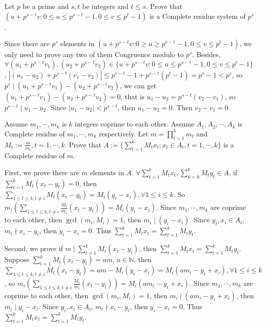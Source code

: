 \documentclass{ctexart}
\begin{document}
\begin{problem}\label{pro:p40.1}
  Let \(p\) be a prime and \(s,t\) be integers and \(t \leq s\).
  Prove that \((u+p^{s-t}v:0 \leq u \leq p^{s-t}-1,0 \leq v \leq p^t-1)\) is a Complete residue system of \(p^s\).
\end{problem}
\begin{solution}
  Since there are \(p^s\) elements in \((u + p^{s-t}v: 0 \geq u \geq p^{s-t} -1, 0 \leq v \leq p^t -1)\), we only need to prove
  any two of them Congruence modulo to \(p^s\). Besides, \(\forall (u_1 + p^{s- t}v_1), (u_2 + p^{s-t}v_2) \in \{u+p^{s-t}v:0 \leq u \leq p^{s-t}-1,0 \leq v \leq p^t-1\}\),
  \(|(u_1-u_2)+p^{s-t}(v_1 - v_2)| \leq p^{s-t} - 1 + p^{s-t}(p^t -1)=p^s -1 <p^s \), so \(p^s \mid  (u_1 + p^{s- t}v_1)-(u_2 + p^{s-t}v_2)\),
  we can get \( (u_1 + p^{s- t}v_1)-(u_2 + p^{s-t}v_2)=0\), that is \(u_{1}- u_2=p^{s-t}(v_2 -v_1)\), so \(p^{s-t} \mid u_{1}-u_2\).
  Since \(|u_1 -u_2 |< p^{s-t}\), then \(u_1-u_2=0\). Then \(v_2-v_1=0\).
\end{solution}

\begin{problem}\label{pro:p40.2}
  Assume \(m_1,\cdots,m_k\) is \(k\) integers coprime to each other.
  Assume \(A_1,A_2,\cdots,A_k\) is Complete residue of \(m_1,\cdots,m_k\) respectively.
  Let \(m=\prod_{t=1}^{k}m_t\) and \(M_t:=\frac{m}{m_t},t=1,\cdots,k\).
  Prove that \(A:=\{\sum_{t=1}^{k}M_t x_t:x_t \in A_t,t=1,\cdots,k\}\) is a Complete residue of \(m\).
\end{problem}
\begin{solution}
  First, we prove there are \(m\) elements in \(A\). \(\forall \sum_{t=1}^{k}M_tx_t, \sum_{k=0}^{k}M_ty_t \in A\),
  if \(\sum_{t=1}^{k}M_t(x_t-y_t) =0 \), then \(\sum_{1 \leq t \leq k, t \neq i} M_t(x_t-y_t)=M_i(y_i-x_i), \forall 1 \leq i \leq k\).
  So \(m_i (\sum_{1 \leq t \leq k, t \neq i}\frac{M_t}{m_i}(x_t - y_t)) = M_i(y_i - x_i)\).
  Since \(m_1,\cdots,m_k\) are coprime to each other,
  then \(\gcd(m_i,M_i)=1\),
  then \(m_i \mid (y_i-x_i)\).
  Since \(y_i,x_i \in A_i\), \(m_i \nmid x_i-y_i\), then \(y_i-x_i=0\).
  Thus \(\sum_{t=1}^{k} M_tx_t=\sum_{t=1}^{k}M_ty_t\).

  Second, we prove if \(m \mid \sum_{t=1}^{k}M_t(x_t-y_t)\), then \(\sum_{t=1}^{k}M_tx_t=\sum_{t=1}^{k}M_ty_t\).
  Suppose \(\sum_{t=1}^{k} M_t(x_t -y_t)=am\), \(a \in \mathbb{N}\), then
  \(\sum_{1 \leq t \leq k, t \neq i} M_t(x_t-y_t)=am-M_i(y_i-x_i)=M_i(am_i-y_i+x_i), \forall 1 \leq i \leq k\),
  so \(m_i (\sum_{1 \leq t \leq k, t \neq i}\frac{M_t}{m_i}(x_t - y_t)) = M_i(am_i-y_i + x_i)\).
  Since \(m_1,\cdots,m_k\) are coprime to each other,
  then \(\gcd(m_i,M_i)=1\),
  then \(m_i \mid (am_i-y_i+x_i)\),
  then \(m_i \mid y_i-x_i\).
  Since \(y_i,x_i \in A_i\), \(m_i \nmid x_i-y_i\), then \(y_i-x_i=0\).
  Thus \(\sum_{t=1}^{k} M_tx_t=\sum_{t=1}^{k}M_ty_t\).
\end{solution}
\end{document}
